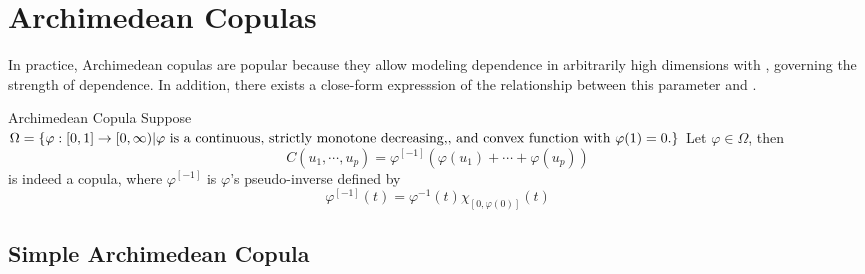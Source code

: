 \documentclass[12pt]{article}
\begin{document}
\section{Archimedean Copulas}
In practice, Archimedean copulas are popular because they allow modeling dependence in arbitrarily high dimensions with , governing the strength of dependence. In addition, there exists a close-form expresssion of the relationship between this parameter and .
\begin{sdefinition}{Archimedean Copula}{}
Suppose $\Omega = \{\varphi:[0,1] \to [0,\infty) | \text{$\varphi$ is a continuous,
strictly monotone decreasing,} \\ \text{, and convex function with $\varphi(1)=0$.} \}$ Let $\varphi \in \Omega$, then 
$$
C(u_1,\cdots,u_p) = \varphi^{[-1]}(\varphi(u_1)+\cdots+\varphi(u_p))
$$
is indeed a copula, where  $\varphi^{[-1]}$ is $\varphi$'s pseudo-inverse defined by
$$
\varphi^{[-1]}(t) = \varphi^{-1}(t) \chi_{[0,\varphi(0)]}(t)
$$
\end{sdefinition}



\subsection{Simple Archimedean Copula}

\end{document}

